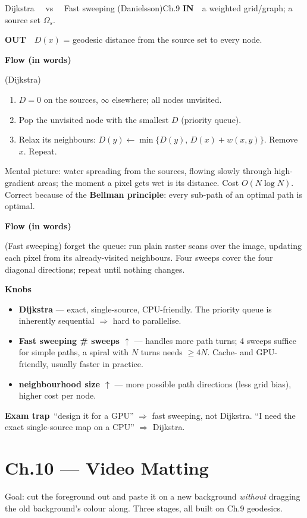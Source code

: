 \documentclass[9pt,a4paper]{extarticle}
\newcommand{\IN}{\textbf{\color{cIn}IN}\ }
\newcommand{\OUT}{\par\textbf{\color{cOut}OUT}\ }
\newcommand{\FLOW}{\par\smallskip\textbf{Flow (in words)}\par\nopagebreak}
\newcommand{\KNOBS}{\par\smallskip\textbf{Knobs}\par\nopagebreak}
\newcommand{\TRAP}{\par\smallskip\textbf{\color{cTrap}Exam trap}\ }
\newcommand{\up}{$\uparrow$}
\newcommand{\kn}[2]{\item \textbf{#1} --- #2}
\begin{document}
\begin{card}{Dijkstra \ \ vs \ \ Fast sweeping (Danielsson)}{Ch.9}
\IN\ a weighted grid/graph; a source set $\Omega_s$.
\OUT\ $D(x)$ = geodesic distance from the source set to every node.

\FLOW (Dijkstra)
\begin{enumerate}
  \item $D=0$ on the sources, $\infty$ elsewhere; all nodes unvisited.
  \item Pop the unvisited node with the smallest $D$ (priority queue).
  \item Relax its neighbours: $D(y)\leftarrow\min\{D(y),\,D(x)+w(x,y)\}$. Remove $x$. Repeat.
\end{enumerate}
Mental picture: water spreading from the sources, flowing slowly through high-gradient areas; the moment a pixel gets wet is its distance. Cost $O(N\log N)$. Correct because of the \textbf{Bellman principle}: every sub-path of an optimal path is optimal.

\FLOW (Fast sweeping) forget the queue: run plain raster scans over the image, updating each pixel from its already-visited neighbours. Four sweeps cover the four diagonal directions; repeat until nothing changes.

\KNOBS
\begin{itemize}
  \kn{Dijkstra}{exact, single-source, CPU-friendly. The priority queue is inherently sequential $\Rightarrow$ hard to parallelise.}
  \kn{Fast sweeping \# sweeps \up}{handles more path turns; 4 sweeps suffice for simple paths, a spiral with $N$ turns needs $\ge4N$. Cache- and GPU-friendly, usually faster in practice.}
  \kn{neighbourhood size \up}{more possible path directions (less grid bias), higher cost per node.}
\end{itemize}
\TRAP ``design it for a GPU'' $\Rightarrow$ fast sweeping, not Dijkstra. ``I need the exact single-source map on a CPU'' $\Rightarrow$ Dijkstra.
\end{card}

\section{Ch.10 --- Video Matting}

Goal: cut the foreground out and paste it on a new background \emph{without} dragging the old background's colour along. Three stages, all built on Ch.9 geodesics.
\end{document}
